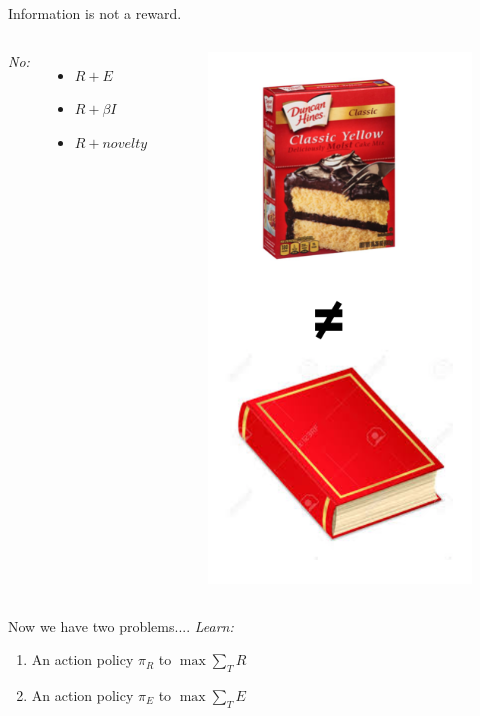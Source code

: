 \documentclass[10pt]{beamer}
\begin{document}
\begin{frame}[fragile]{Information is not a reward.}
\begin{columns}
\textit{No:}
\begin{itemize}
    \item $R + E$
    \item $R + \beta I$
    \item $R + novelty$
\end{itemize}

\begin{figure}
    \centering
    \includegraphics[scale=0.4]{images/cake_book.png}
    \caption{}
\end{figure}
\end{columns}
\end{frame}

\begin{frame}[fragile]{Now we have two problems....}
\textit{Learn:}
\begin{enumerate}
    \item An action policy $\pi_R$ to $\max \sum_T R$
    \item An action policy $\pi_E$ to $\max \sum_T E$
\end{enumerate}
\end{frame}
\end{document}
